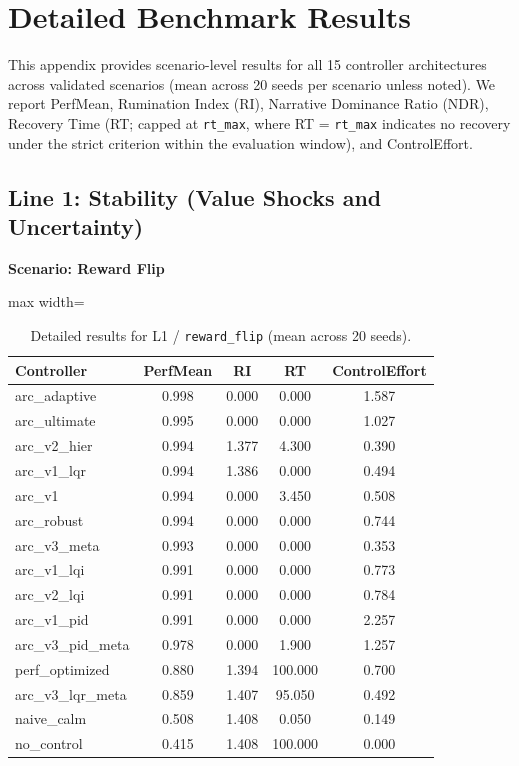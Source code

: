 \documentclass{article}
\newcommand{\scenarioheader}[1]{\Needspace{20\baselineskip}\textbf{Scenario: #1}}
\begin{document}
\section{Detailed Benchmark Results}
This appendix provides scenario-level results for all 15 controller architectures across validated scenarios (mean across 20 seeds per scenario unless noted). We report PerfMean, Rumination Index (RI), Narrative Dominance Ratio (NDR), Recovery Time (RT; capped at \texttt{rt\_max}, where RT = \texttt{rt\_max} indicates no recovery under the strict criterion within the evaluation window), and ControlEffort.

\subsection{Line 1: Stability (Value Shocks and Uncertainty)}

\scenarioheader{Reward Flip}

\begin{table}[H]
\centering
\footnotesize
\caption{Detailed results for L1 / \texttt{reward\_flip} (mean across 20 seeds).}
\label{tab:g1_reward_flip}
\begin{adjustbox}{max width=\textwidth}
\begin{tabular}{@{}lcccc@{}}
\toprule
Controller & PerfMean & RI & RT & ControlEffort \\ \midrule
arc\_adaptive & 0.998 & 0.000 & 0.000 & 1.587 \\
arc\_ultimate & 0.995 & 0.000 & 0.000 & 1.027 \\
arc\_v2\_hier & 0.994 & 1.377 & 4.300 & 0.390 \\
arc\_v1\_lqr & 0.994 & 1.386 & 0.000 & 0.494 \\
arc\_v1 & 0.994 & 0.000 & 3.450 & 0.508 \\
arc\_robust & 0.994 & 0.000 & 0.000 & 0.744 \\
arc\_v3\_meta & 0.993 & 0.000 & 0.000 & 0.353 \\
arc\_v1\_lqi & 0.991 & 0.000 & 0.000 & 0.773 \\
arc\_v2\_lqi & 0.991 & 0.000 & 0.000 & 0.784 \\
arc\_v1\_pid & 0.991 & 0.000 & 0.000 & 2.257 \\
arc\_v3\_pid\_meta & 0.978 & 0.000 & 1.900 & 1.257 \\
perf\_optimized & 0.880 & 1.394 & 100.000 & 0.700 \\
arc\_v3\_lqr\_meta & 0.859 & 1.407 & 95.050 & 0.492 \\
naive\_calm & 0.508 & 1.408 & 0.050 & 0.149 \\
no\_control & 0.415 & 1.408 & 100.000 & 0.000 \\ \bottomrule
\end{tabular}
\end{adjustbox}
\end{table}
\end{document}
